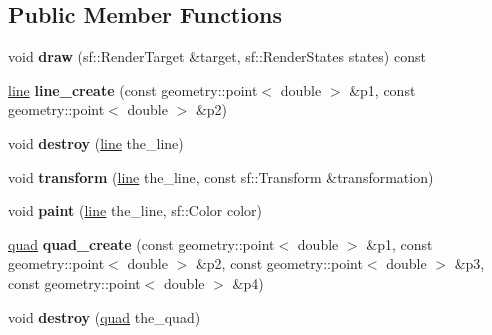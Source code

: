 \subsection*{Public Member Functions}
\begin{DoxyCompactItemize}
\item 
\hypertarget{classophidian_1_1gui_1_1canvas_aaca910a2c59a4025e9b0b3442f137f98}{void {\bfseries draw} (sf\-::\-Render\-Target \&target, sf\-::\-Render\-States states) const }\label{classophidian_1_1gui_1_1canvas_aaca910a2c59a4025e9b0b3442f137f98}

\item 
\hypertarget{classophidian_1_1gui_1_1canvas_aed1e6f8fdd5f0c625d7572e6a4ab59fe}{\hyperlink{structophidian_1_1gui_1_1line}{line} {\bfseries line\-\_\-create} (const geometry\-::point$<$ double $>$ \&p1, const geometry\-::point$<$ double $>$ \&p2)}\label{classophidian_1_1gui_1_1canvas_aed1e6f8fdd5f0c625d7572e6a4ab59fe}

\item 
\hypertarget{classophidian_1_1gui_1_1canvas_a9156ed97649c8244f688791689eba19d}{void {\bfseries destroy} (\hyperlink{structophidian_1_1gui_1_1line}{line} the\-\_\-line)}\label{classophidian_1_1gui_1_1canvas_a9156ed97649c8244f688791689eba19d}

\item 
\hypertarget{classophidian_1_1gui_1_1canvas_ae117d60f0979578bd9bac63be6179a69}{void {\bfseries transform} (\hyperlink{structophidian_1_1gui_1_1line}{line} the\-\_\-line, const sf\-::\-Transform \&transformation)}\label{classophidian_1_1gui_1_1canvas_ae117d60f0979578bd9bac63be6179a69}

\item 
\hypertarget{classophidian_1_1gui_1_1canvas_afb78116593026808ecb6ec7a870c66eb}{void {\bfseries paint} (\hyperlink{structophidian_1_1gui_1_1line}{line} the\-\_\-line, sf\-::\-Color color)}\label{classophidian_1_1gui_1_1canvas_afb78116593026808ecb6ec7a870c66eb}

\item 
\hypertarget{classophidian_1_1gui_1_1canvas_ae396375c572bfe75f54277674d20a08e}{\hyperlink{structophidian_1_1gui_1_1quad}{quad} {\bfseries quad\-\_\-create} (const geometry\-::point$<$ double $>$ \&p1, const geometry\-::point$<$ double $>$ \&p2, const geometry\-::point$<$ double $>$ \&p3, const geometry\-::point$<$ double $>$ \&p4)}\label{classophidian_1_1gui_1_1canvas_ae396375c572bfe75f54277674d20a08e}

\item 
\hypertarget{classophidian_1_1gui_1_1canvas_ab7c7686eee63a440b88d53922094ede3}{void {\bfseries destroy} (\hyperlink{structophidian_1_1gui_1_1quad}{quad} the\-\_\-quad)}\label{classophidian_1_1gui_1_1canvas_ab7c7686eee63a440b88d53922094ede3}


\end{DoxyCompactItemize}
